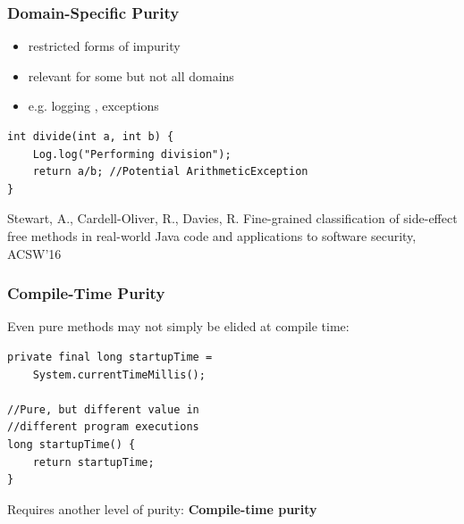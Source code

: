 \documentclass{beamer}
\begin{document}
\begin{frame}[fragile]
\frametitle{Domain-Specific Purity}
\begin{itemize}
	\item restricted forms of impurity
	\item relevant for some but not all domains
	\item e.g. logging \cite{FineGrained}, exceptions
\end{itemize}
\vspace{2mm}
\begin{lstlisting}
int divide(int a, int b) {
	Log.log("Performing division");
	return a/b; //Potential ArithmeticException
}
\end{lstlisting}
\vspace{5mm}
\begin{thebibliography}{999999}
	Stewart, A., Cardell-Oliver, R., Davies, R. \newblock Fine-grained classification of side-effect free methods in real-world Java code and applications to software security, \newblock ACSW'16
\end{thebibliography}
\end{frame}

\begin{frame}[fragile]
\frametitle{Compile-Time Purity}
\vspace{-3mm}
Even pure methods may not simply be elided at compile time:
\pause
\vspace{5mm}
\begin{lstlisting}
private final long startupTime = 
	System.currentTimeMillis();

//Pure, but different value in
//different program executions
long startupTime() {
	return startupTime;
}
\end{lstlisting}
\pause
\vspace{5mm}
Requires another level of purity: \textbf{Compile-time purity}
\end{frame}
\end{document}
